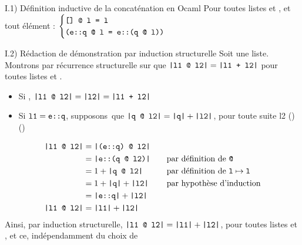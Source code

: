 


\begin{question}{I.1) }{Définition inductive de la concaténation en Ocaml}
    Pour toutes listes  et , et tout élément  :
    $\begin{cases}
        \texttt{[] @ l = l} \\
        \texttt{(e::q @ l = e::(q @ l))}
    \end{cases}$

\end{question}

\begin{question}{I.2) }{Rédaction de démonstration par induction structurelle}
    Soit  une liste.
    Montrons par récurrence structurelle sur  que $\texttt{|l1 @ l2|} = \texttt{|l1 + l2|}$ pour toutes listes  et .
   \begin{itemize}
       \item Si , $\texttt{|l1 @ l2|} = \texttt{|l2|} = \texttt{|l1 + l2|}$
       \item Si $\texttt{l1} = \texttt{e::q}$, \hbox{supposons que} $\texttt{|q @ l2|} = \texttt{|q|} + \texttt{|l2|}$, pour toute suite l2 () ()
    \end{itemize}
    \begin{align*}
        \texttt{|l1 @ l2|} & = \texttt{|(e::q) @ l2|} && \\
        & = \texttt{|e::(q @ l2)|} \quad &&\text{par définition de \texttt{@}} \\
        & = 1 + \texttt{|q @ l2|} &&\text{par définition de $\texttt{l} \mapsto \texttt{l}$} \\
        & = 1 + \texttt{|q|} + \texttt{|l2|}  &&\text{par hypothèse d'induction} \\
        & = \texttt{|e::q|} + \texttt{|l2|} && \\
        \texttt{|l1 @ l2|} & = \texttt{|l1|} + \texttt{|l2|} &&
    \end{align*}
    Ainsi, par induction structurelle, $\texttt{|l1 @ l2|} = \texttt{|l1|} + \texttt{|l2|}$, pour toutes listes  et , et ce, indépendamment du choix de 
\end{question}


